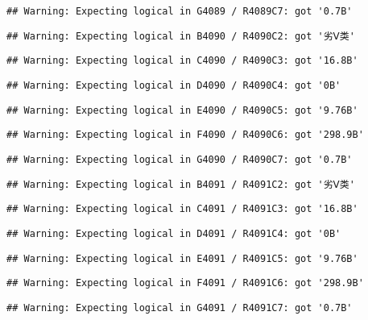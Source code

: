 \documentclass[
]{article}
\begin{document}
\begin{verbatim}
## Warning: Expecting logical in G4089 / R4089C7: got '0.7B'
\end{verbatim}

\begin{verbatim}
## Warning: Expecting logical in B4090 / R4090C2: got '劣Ⅴ类'
\end{verbatim}

\begin{verbatim}
## Warning: Expecting logical in C4090 / R4090C3: got '16.8B'
\end{verbatim}

\begin{verbatim}
## Warning: Expecting logical in D4090 / R4090C4: got '0B'
\end{verbatim}

\begin{verbatim}
## Warning: Expecting logical in E4090 / R4090C5: got '9.76B'
\end{verbatim}

\begin{verbatim}
## Warning: Expecting logical in F4090 / R4090C6: got '298.9B'
\end{verbatim}

\begin{verbatim}
## Warning: Expecting logical in G4090 / R4090C7: got '0.7B'
\end{verbatim}

\begin{verbatim}
## Warning: Expecting logical in B4091 / R4091C2: got '劣Ⅴ类'
\end{verbatim}

\begin{verbatim}
## Warning: Expecting logical in C4091 / R4091C3: got '16.8B'
\end{verbatim}

\begin{verbatim}
## Warning: Expecting logical in D4091 / R4091C4: got '0B'
\end{verbatim}

\begin{verbatim}
## Warning: Expecting logical in E4091 / R4091C5: got '9.76B'
\end{verbatim}

\begin{verbatim}
## Warning: Expecting logical in F4091 / R4091C6: got '298.9B'
\end{verbatim}

\begin{verbatim}
## Warning: Expecting logical in G4091 / R4091C7: got '0.7B'
\end{verbatim}
\end{document}
